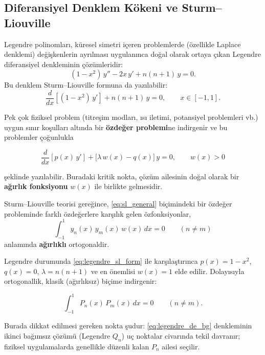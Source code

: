 \subsection{Diferansiyel Denklem Kökeni ve Sturm--Liouville}

Legendre polinomları, küresel simetri içeren problemlerde (özellikle Laplace denklemi)
değişkenlerin ayrılması uygulanınca doğal olarak ortaya çıkan Legendre diferansiyel denkleminin çözümleridir:
\begin{equation}
(1-x^2)\,y''-2x\,y' + n(n+1)\,y = 0.
\label{eq:legendre_de_bg}
\end{equation}
Bu denklem Sturm--Liouville formuna da yazılabilir:
\begin{equation}
\frac{d}{dx}\!\left[(1-x^2)\,y'\right] + n(n+1)\,y = 0,
\qquad x\in[-1,1].
\label{eq:legendre_sl_form}
\end{equation}


Pek çok fiziksel problem (titreşim modları, ısı iletimi, potansiyel problemleri vb.) uygun sınır koşulları altında bir \textbf{özdeğer problemi}ne indirgenir ve bu problemler çoğunlukla

\begin{equation}
\frac{d}{dx}\!\left[p(x)\,y'\right] + \bigl[\lambda\,w(x)-q(x)\bigr]\,y = 0,
\qquad w(x)>0
\label{eq:sl_general}
\end{equation}

şeklinde yazılabilir. Buradaki kritik nokta, çözüm ailesinin doğal olarak bir \textbf{ağırlık fonksiyonu} $w(x)$ ile birlikte gelmesidir.

Sturm--Liouville teorisi gereğince, \eqref{eq:sl_general} biçimindeki bir özdeğer probleminde
farklı özdeğerlere karşılık gelen özfonksiyonlar,
\begin{equation}
\int_{-1}^{1} y_n(x)\,y_m(x)\,w(x)\,dx = 0 \qquad (n\neq m)
\label{eq:sl_ortho_general}
\end{equation}
anlamında \textbf{ağırlıklı} ortogonaldir.

Legendre durumunda \eqref{eq:legendre_sl_form} ile karşılaştırınca
$p(x)=1-x^2$, $q(x)=0$, $\lambda=n(n+1)$ ve en önemlisi $w(x)=1$ elde edilir.
Dolayısıyla ortogonallik, klasik (ağırlıksız) biçime indirgenir:

\begin{equation}
\int_{-1}^{1} P_n(x)\,P_m(x)\,dx = 0 \qquad (n\neq m).
\label{eq:legendre_ortho_bg}
\end{equation}

Burada dikkat edilmesi gereken nokta şudur:
\eqref{eq:legendre_de_bg} denkleminin ikinci bağımsız çözümü (Legendre $Q_n$) uç noktalar civarında tekil davranır; fiziksel uygulamalarda genellikle düzenli kalan $P_n$ ailesi seçilir.

